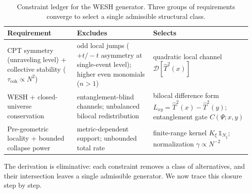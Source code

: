 \documentclass[12pt,a4paper]{article}
\numberwithin{equation}{section}
\begin{document}
\begin{table}[h]
\centering
\small
\renewcommand{\arraystretch}{1.25}
\begin{tabular}{p{3.5cm}|p{4.5cm}|p{4.6cm}}
\toprule
\textbf{Requirement} & \textbf{Excludes} & \textbf{Selects} \\
\midrule
CPT symmetry \newline (unraveling level) + \newline collective stability \newline ($\tau_{\mathrm{coh}} \propto N^2$) & odd local jumps \newline ($+t/-t$ asymmetry at \newline single-event level); \newline higher even monomials ($n > 1$) & quadratic local channel $\mathcal{D}[\hat T^2(x)]$ \\
\hline
WESH + \newline closed-universe \newline conservation & entanglement-blind channels; \newline unbalanced bilocal redistribution & bilocal difference form \newline $L_{xy} = \hat T^2(x) - \hat T^2(y)$; \newline entanglement gate $C(\Psi;x,y)$ \\
\hline
Pre-geometric locality \newline + bounded collapse power & metric-dependent support; \newline unbounded total rate & finite-range kernel $K_\xi\,\mathbb{1}_{N_\xi}$; \newline normalization $\gamma \propto N^{-2}$ \\
\bottomrule
\end{tabular}
\caption{Constraint ledger for the WESH generator. Three groups of requirements converge to select a single admissible structural class.}
\label{tab:constraint-ledger}
\end{table}

\noindent The derivation is eliminative: each constraint removes a class of alternatives, and their intersection leaves a single admissible generator. We now trace this closure step by step.
\end{document}
